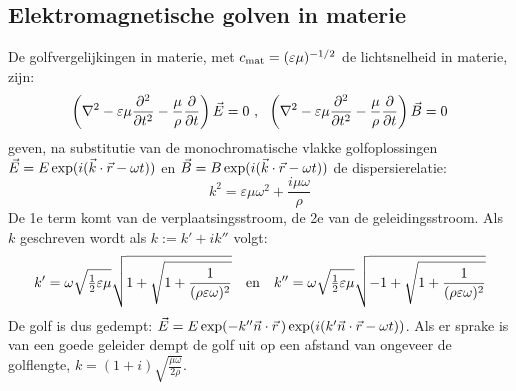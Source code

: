 \documentclass[twoside]{report}
\begin{document}
\subsection{Elektromagnetische golven in materie}
De golfvergelijkingen in materie, met $c_{\rm mat}=(\varepsilon\mu)^{-1/2}$
de lichtsnelheid in materie, zijn:
\[
\left(\nabla^2-\varepsilon\mu\frac{\partial^2 }{\partial t^2}-\frac{\mu}{\rho}\frac{\partial }{\partial t}\right)\vec{E}=0~,~~
\left(\nabla^2-\varepsilon\mu\frac{\partial^2 }{\partial t^2}-\frac{\mu}{\rho}\frac{\partial }{\partial t}\right)\vec{B}=0
\]
geven, na substitutie van de monochromatische vlakke golfoplossingen
$\vec{E}=E\exp(i(\vec{k}\cdot\vec{r}-\omega t))$ en
$\vec{B}=B\exp(i(\vec{k}\cdot\vec{r}-\omega t))$ de dispersierelatie:
\[
k^2=\varepsilon\mu\omega^2+\frac{i\mu\omega}{\rho}
\]
De 1e term komt van de verplaatsingsstroom, de 2e van de geleidingsstroom.
Als $k$ geschreven wordt als $k:=k'+ik''$ volgt:
\[
k'=\omega\sqrt{\mbox{$\frac{1}{2}$}\varepsilon\mu}\sqrt{1+\sqrt{1+\frac{1}{(\rho\varepsilon\omega)^2}}}~~~\mbox{en}~~~
k''=\omega\sqrt{\mbox{$\frac{1}{2}$}\varepsilon\mu}\sqrt{-1+\sqrt{1+\frac{1}{(\rho\varepsilon\omega)^2}}}
\]
De golf is dus gedempt: $\vec{E}=E\exp(-k''\vec{n}\cdot\vec{r}\,)\exp(i(k'\vec{n}\cdot\vec{r}-\omega t))$.
Als er sprake is van een goede geleider dempt de golf uit op een afstand van
ongeveer de golflengte, $\displaystyle k=(1+i)\sqrt{\frac{\mu\omega}{2\rho}}$.
\end{document}

